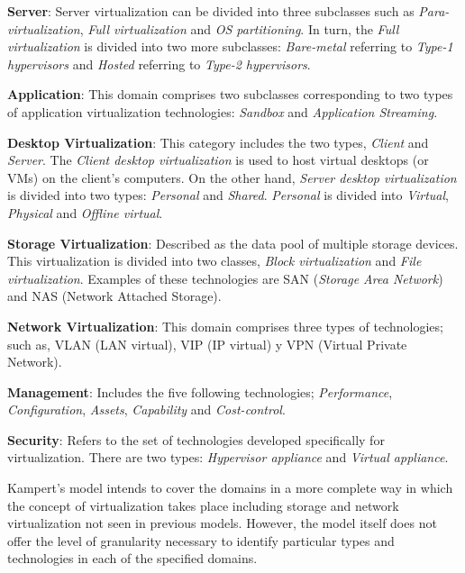 	\textbf{Server}:  Server virtualization can be divided into three subclasses such as \textit{Para-virtualization}, \textit{Full virtualization} and \textit{OS partitioning}. In turn, the \textit{Full virtualization} is divided into two more subclasses: \textit{Bare-metal} referring to \textit {Type-1 hypervisors} and \textit{Hosted} referring to \textit {Type-2 hypervisors}.
		
	\textbf {Application}: This domain comprises two subclasses corresponding to two types of application virtualization technologies: \textit{Sandbox} and \textit{Application Streaming}.
		
	\textbf{Desktop Virtualization}: This category includes the two types, \textit{Client} and \textit{Server}. The \textit{Client desktop virtualization} is used to host virtual desktops (or VMs) on the client's computers. On the other hand, \textit{Server desktop virtualization} is divided into two types: \textit{Personal} and \textit{Shared}. \textit{Personal} is divided into \textit{Virtual}, \textit{Physical} and \textit{Offline virtual}.
		
	\textbf {Storage Virtualization}: Described as the data pool of multiple storage devices. This virtualization is divided into two classes,  \textit {Block virtualization} and \textit {File virtualization}. Examples of these technologies are SAN (\textit{Storage Area Network}) and NAS (Network Attached Storage).
		
	\textbf{Network Virtualization}: This domain comprises three types of technologies; such as, VLAN (LAN virtual), VIP (IP virtual) y VPN (Virtual Private Network).
		
    \textbf{Management}: Includes the five following technologies;  \textit{Performance}, \textit{Configuration}, \textit{Assets}, \textit{Capability} and \textit {Cost-control}.
		
	\textbf {Security}: Refers to the set of technologies developed specifically for virtualization. There are two types: \textit{Hypervisor appliance} and \textit{Virtual appliance}.
		
	Kampert's model intends to cover the domains in a more complete way in which the concept of virtualization takes place including storage and network virtualization not seen in previous models. However, the model itself does not offer the level of granularity necessary to identify particular types and technologies in each of the specified domains.
